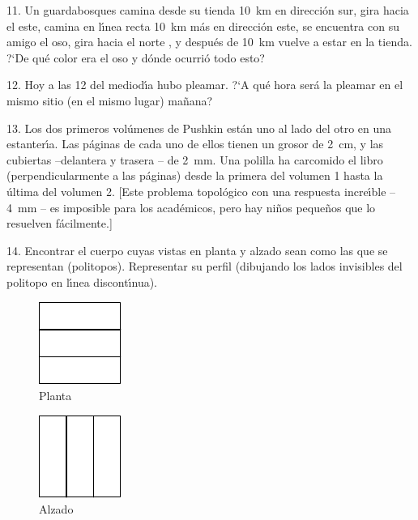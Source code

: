 \begin{problem}{11.}
	Un guardabosques camina desde su tienda \SI{10}{\km} en direcci\'on sur, gira hacia el este, camina en l\'{\i}nea recta
	\SI{10}{\km} m\'as en direcci\'on este, se encuentra con su amigo el oso, gira hacia el norte , y despu\'es de \SI{10}{\km} vuelve a
	estar en la tienda. ?`De qu\'e color era el oso y d\'onde ocurri\'o todo esto?
\end{problem}

\begin{problem}{12.}
	Hoy a las 12 del mediod\'{\i}a hubo pleamar. ?`A qu\'e hora ser\'a la pleamar en el mismo sitio (en el mismo lugar)
	ma\~nana?
\end{problem}

\begin{problem}{13.}
	Los dos primeros vol\'umenes de Pushkin est\'an uno al lado del otro en una estanter\'{\i}a. 
	Las p\'aginas de cada uno de ellos tienen un grosor de \SI{2}{\cm}, y las cubiertas --delantera y trasera 
	-- de \SI{2}{\mm}. Una polilla ha carcomido el libro (perpendicularmente a las p\'aginas) desde la primera del volumen 1 hasta
	la \'ultima del volumen 2.
	[Este problema topol\'ogico con una respuesta incre\'{\i}ble -- \SI{4}{\mm} -- es imposible para los acad\'emicos,
	pero hay ni\~nos peque\~nos que lo resuelven f\'acilmente.]  
\end{problem}

\begin{problem}{14.}
	Encontrar el cuerpo cuyas vistas en planta y alzado sean como las que se representan (politopos).
	Representar su perfil (dibujando los lados invisibles del politopo en l\'{\i}nea discont\'{\i}nua).
	\begin{figure}
		\footnotesize
		\null\hfill
		\parbox{0.2\linewidth}{\centering\includegraphics{taskbook-99}\\Planta}
		\hfill
		\parbox{0.2\linewidth}{\centering\includegraphics{taskbook-98}\\Alzado}
		\hfill\null
	\end{figure}
\end{problem}

